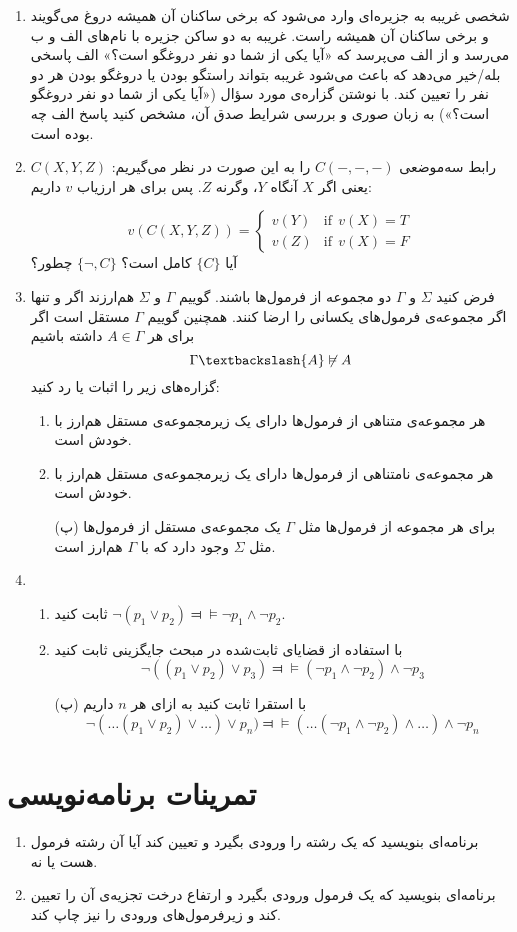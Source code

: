 \documentclass[12pt, 14paper]{article}
\begin{document}
\begin{enumerate}
\item
شخصی غریبه به جزیره‌ای وارد می‌شود که برخی ساکنان آن همیشه دروغ می‌گویند و برخی ساکنان آن همیشه راست. غریبه به دو ساکن جزیره با نام‌های الف و ب می‌رسد و از الف می‌پرسد که «آیا یکی از شما دو نفر دروغگو است؟» الف پاسخی بله/خیر می‌دهد که باعث می‌شود غریبه بتواند راستگو بودن یا دروغگو بودن هر دو نفر را تعیین کند. با نوشتن گزاره‌ی مورد سؤال («آیا یکی از شما دو نفر دروغگو است؟») به زبان صوری و بررسی شرایط صدق آن، مشخص کنید پاسخ الف چه بوده است.

\item
رابط سه‌موضعی $C(-,-,-)$ را به این صورت در نظر می‌گیریم: $C(X,Y,Z)$ یعنی اگر $X$ آنگاه $Y$، وگرنه $Z$. پس برای هر ارزیاب $v$ داریم:

$$
v(C(X,Y,Z))=
\begin{cases}
v(Y) & \text{if}~~v(X)=T\\
v(Z) & \text{if}~~v(X)=F
\end{cases}
$$
آیا $\{C\}$ کامل است؟ $\{\neg, C\}$ چطور؟

\item
فرض کنید $\Sigma$ و $\Gamma$ دو مجموعه از فرمول‌ها باشند. گوییم $\Gamma$ و $\Sigma$ هم‌ارزند اگر و تنها اگر مجموعه‌ی فرمول‌های یکسانی را ارضا کنند. همچنین گوییم $\Gamma$ مستقل است اگر برای هر $A\in\Gamma$ داشته باشیم
$$
\Gamma\textbackslash\{A\}\not\vDash A
$$
گزاره‌های زیر را اثبات یا رد کنید:
\begin{enumerate}
\item
هر مجموعه‌ی متناهی از فرمول‌ها دارای یک زیرمجموعه‌ی مستقل هم‌ارز با خودش است.
\item
هر مجموعه‌ی نامتناهی از فرمول‌ها دارای یک زیرمجموعه‌ی مستقل هم‌ارز با خودش است.
\item[(پ)]
برای هر مجموعه از فرمول‌ها مثل $\Gamma$ یک مجموعه‌ی مستقل از فرمول‌ها مثل $\Sigma$ وجود دارد که با $\Gamma$ هم‌ارز است.
\end{enumerate}

\item
\begin{enumerate}
\item
ثابت کنید
$\neg(p_1\vee p_2)\Dashv\vDash\neg p_1\wedge\neg p_2$.

\item
با استفاده از قضایای ثابت‌شده در مبحث جایگزینی ثابت کنید
$$\neg((p_1\vee p_2)\vee p_3)\Dashv\vDash (\neg p_1 \wedge \neg p_2)\wedge\neg p_3$$

\item[(پ)]
با استقرا ثابت کنید به ازای هر $n$ داریم
$$\neg(\ldots(p_1\vee p_2)\vee \ldots)\vee p_n)\Dashv\vDash (\ldots(\neg p_1\wedge \neg p_2)\wedge\ldots)\wedge\neg p_n$$

\end{enumerate}

\end{enumerate}

\section{تمرینات برنامه‌نویسی}

\begin{enumerate}
\item
برنامه‌ای بنویسید که یک رشته را ورودی بگیرد و تعیین کند آیا آن رشته فرمول هست یا نه.
\item
برنامه‌ای بنویسید که یک فرمول ورودی بگیرد و ارتفاع درخت تجزیه‌ی آن را تعیین کند و زیرفرمول‌های ورودی را نیز چاپ کند.
\end{enumerate}
\end{document}
